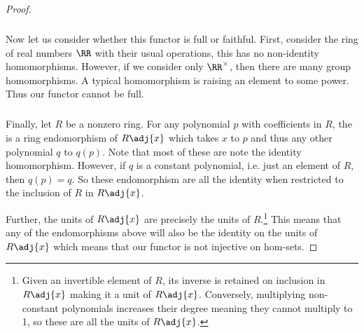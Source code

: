\documentclass[../../main]{subfiles}
\begin{document}
\begin{proof}
	\subparagraph{}
	Now let us consider whether this functor is full or faithful. First,
	consider the ring of real numbers \(\RR\) with their usual operations, this
	has no non-identity homomorphisms. However, if we consider only
	\(\RR^\times\), then there are many group homomorphisms. A typical
	homomorphism is raising an element to some power. Thus our functor cannot be
	full.

	\subparagraph{}
	Finally, let \(R\) be a nonzero ring. For any polynomial \(p\) with
	coefficients in \(R\), the is a ring endomorphism of \(R\adj{x}\) which
	takes \(x\) to \(p\) and thus any other polynomial \(q\) to \(q(p)\). Note
	that most of these are note the identity homomorphism. However, if \(q\) is
	a constant polynomial, i.e. just an element of \(R\), then \(q(p)=q\). So
	these endomorphism are all the identity when restricted to the inclusion of
	\(R\) in \(R\adj{x}\).

	Further, the units of \(R\adj{x}\) are precisely the units of
	\(R\).\footnote{Given an invertible element of \(R\), its inverse is
		retained on inclusion in \(R\adj{x}\) making it a unit of \(R\adj{x}\).
		Conversely, multiplying non-constant polynomials increases their degree
		meaning they cannot multiply to 1, so these are all the units of
	\(R\adj{x}\).} This means that any of the endomorphisms above will also be
	the identity on the units of \(R\adj{x}\) which means that our functor is
	not injective on hom-sets.
\end{proof}
\end{document}
